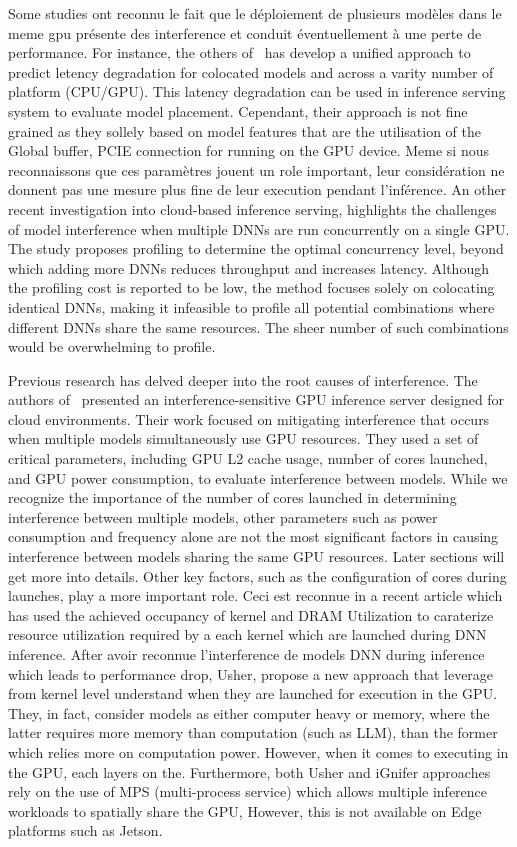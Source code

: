 Some studies ont reconnu le fait que le déploiement de plusieurs modèles dans le meme gpu présente des interference et conduit éventuellement à une perte de performance. For instance, the others of~ has develop a unified approach to predict letency degradation for colocated models and across a varity number of platform (CPU/GPU). This latency degradation can be used in inference serving system to evaluate model placement. Cependant, their approach is not fine grained as they sollely based on model features that are the utilisation of the Global buffer, PCIE connection for running on the GPU device. Meme si nous reconnaissons que ces paramètres jouent un role important, leur considération ne donnent pas une mesure plus fine de leur execution pendant l'inférence.
An other recent investigation into cloud-based inference serving,  highlights the challenges of model interference when multiple DNNs are run concurrently on a single GPU. The study proposes profiling to determine the optimal concurrency level, beyond which adding more DNNs reduces throughput and increases latency. Although the profiling cost is reported to be low, the method focuses solely on colocating identical DNNs, making it infeasible to profile all potential combinations where different DNNs share the same resources. The sheer number of such combinations would be overwhelming to profile.

Previous research has delved deeper into the root causes of interference. The authors of~ presented an interference-sensitive GPU inference server designed for cloud environments. Their work focused on mitigating interference that occurs when multiple models simultaneously use GPU resources. They used a set of critical parameters, including GPU L2 cache usage, number of cores launched, and GPU power consumption, to evaluate interference between models. While we recognize the importance of the number of cores launched in determining interference between multiple models, other parameters such as power consumption and frequency alone are not the most significant factors in causing interference between models sharing the same GPU resources. Later sections will get more into details. Other key factors, such as the configuration of cores during launches, play a more important role. Ceci est reconnue in a recent article which has used the achieved occupancy of kernel and DRAM Utilization to caraterize resource utilization required by a each kernel which are launched during DNN inference. After avoir reconnue l'interference de models DNN during inference which leads to performance drop, Usher, propose a new approach that leverage from kernel level understand when they are launched for execution in the GPU. They, in fact, consider models as either computer heavy or memory, where the latter requires more memory than computation (such as LLM), than the former which relies more on computation power. However, when it comes to executing in the GPU, each layers on the. Furthermore, both Usher and iGnifer approaches rely on the use of MPS (multi-process service) which allows multiple inference workloads to spatially share the GPU, However, this is not available on Edge platforms such as Jetson.



